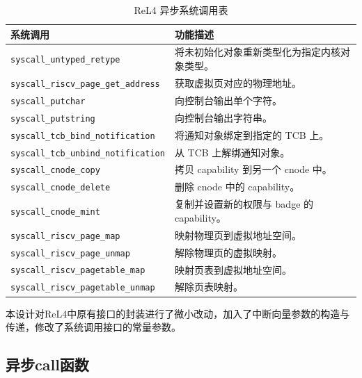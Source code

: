 \begin{table}[htb]
  \centering
  \caption{ReL4 异步系统调用表}\label{syscalltable}
  \begin{tabular}{@{}ll@{}}
    \toprule
    \textbf{系统调用}                               & \textbf{功能描述}                  \\
    \midrule
    \texttt{syscall\_untyped\_retype}           & 将未初始化对象重新类型化为指定内核对象类型。         \\
    \texttt{syscall\_riscv\_page\_get\_address} & 获取虚拟页对应的物理地址。                  \\
    \texttt{syscall\_putchar}                   & 向控制台输出单个字符。                    \\
    \texttt{syscall\_putstring}                 & 向控制台输出字符串。                     \\
    \texttt{syscall\_tcb\_bind\_notification}   & 将通知对象绑定到指定的 TCB 上。             \\
    \texttt{syscall\_tcb\_unbind\_notification} & 从 TCB 上解绑通知对象。                 \\
    \texttt{syscall\_cnode\_copy}               & 拷贝 capability 到另一个 cnode 中。    \\
    \texttt{syscall\_cnode\_delete}             & 删除 cnode 中的 capability。        \\
    \texttt{syscall\_cnode\_mint}               & 复制并设置新的权限与 badge 的 capability。 \\
    \texttt{syscall\_riscv\_page\_map}          & 映射物理页到虚拟地址空间。                  \\
    \texttt{syscall\_riscv\_page\_unmap}        & 解除物理页的虚拟映射。                    \\
    \texttt{syscall\_riscv\_pagetable\_map}     & 映射页表到虚拟地址空间。                   \\
    \texttt{syscall\_riscv\_pagetable\_unmap}   & 解除页表映射。                        \\
    \bottomrule
  \end{tabular}
\end{table}

本设计对ReL4中原有接口的封装进行了微小改动，加入了中断向量参数的构造与传递，修改了系统调用接口的常量参数。

\subsection{异步call函数}\label{sec:asynccallfunc}

